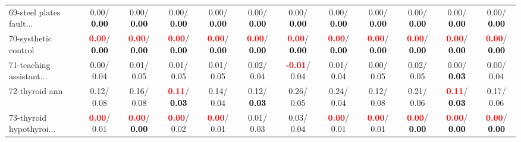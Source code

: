 \begin{table}[h]
\begin{center}
{\begin{tabular}{lc|c|c|c|c|c|c|c|c|c|c}
69-steel plates fault... &   0.00/\textcolor{black}{\textbf{  0.00}} &   0.00/\textcolor{black}{\textbf{  0.00}} &   0.00/\textcolor{black}{\textbf{  0.00}} &   0.00/\textcolor{black}{\textbf{  0.00}} &   0.00/\textcolor{black}{\textbf{  0.00}} &   0.00/\textcolor{black}{\textbf{  0.00}} &   0.00/\textcolor{black}{\textbf{  0.00}} &   0.00/\textcolor{black}{\textbf{  0.00}} &   0.00/\textcolor{black}{\textbf{  0.00}} &   0.00/\textcolor{black}{\textbf{  0.00}} &   0.00/\textcolor{black}{\textbf{  0.00}} \\
70-systhetic control & \textcolor{red}{\textbf{  0.00}}/\textcolor{black}{\textbf{  0.00}} & \textcolor{red}{\textbf{  0.00}}/\textcolor{black}{\textbf{  0.00}} & \textcolor{red}{\textbf{  0.00}}/\textcolor{black}{\textbf{  0.00}} & \textcolor{red}{\textbf{  0.00}}/\textcolor{black}{\textbf{  0.00}} & \textcolor{red}{\textbf{  0.00}}/\textcolor{black}{\textbf{  0.00}} & \textcolor{red}{\textbf{  0.00}}/\textcolor{black}{\textbf{  0.00}} & \textcolor{red}{\textbf{  0.00}}/\textcolor{black}{\textbf{  0.00}} & \textcolor{red}{\textbf{  0.00}}/\textcolor{black}{\textbf{  0.00}} & \textcolor{red}{\textbf{  0.00}}/\textcolor{black}{\textbf{  0.00}} & \textcolor{red}{\textbf{  0.00}}/\textcolor{black}{\textbf{  0.00}} & \textcolor{red}{\textbf{  0.00}}/\textcolor{black}{\textbf{  0.00}} \\
71-teaching assistant... &   0.00/  0.04 &   0.01/  0.05 &   0.01/  0.05 &   0.01/  0.05 &   0.02/  0.04 & \textcolor{red}{\textbf{ -0.01}}/  0.04 &   0.01/  0.04 &   0.00/  0.05 &   0.02/  0.05 &   0.00/\textcolor{black}{\textbf{  0.03}} &   0.00/  0.04 \\ \hline
72-thyroid ann &   0.12/  0.08 &   0.16/  0.08 & \textcolor{red}{\textbf{  0.11}}/\textcolor{black}{\textbf{  0.03}} &   0.14/  0.04 &   0.12/\textcolor{black}{\textbf{  0.03}} &   0.26/  0.05 &   0.24/  0.04 &   0.12/  0.08 &   0.21/  0.06 & \textcolor{red}{\textbf{  0.11}}/\textcolor{black}{\textbf{  0.03}} &   0.17/  0.06 \\
73-thyroid hypothyroi... & \textcolor{red}{\textbf{  0.00}}/  0.01 & \textcolor{red}{\textbf{  0.00}}/\textcolor{black}{\textbf{  0.00}} & \textcolor{red}{\textbf{  0.00}}/  0.02 & \textcolor{red}{\textbf{  0.00}}/  0.01 &   0.01/  0.03 &   0.03/  0.04 & \textcolor{red}{\textbf{  0.00}}/  0.01 & \textcolor{red}{\textbf{  0.00}}/  0.01 & \textcolor{red}{\textbf{  0.00}}/\textcolor{black}{\textbf{  0.00}} & \textcolor{red}{\textbf{  0.00}}/\textcolor{black}{\textbf{  0.00}} & \textcolor{red}{\textbf{  0.00}}/\textcolor{black}{\textbf{  0.00}} \\

\end{tabular}}
\end{center}
\end{table}
